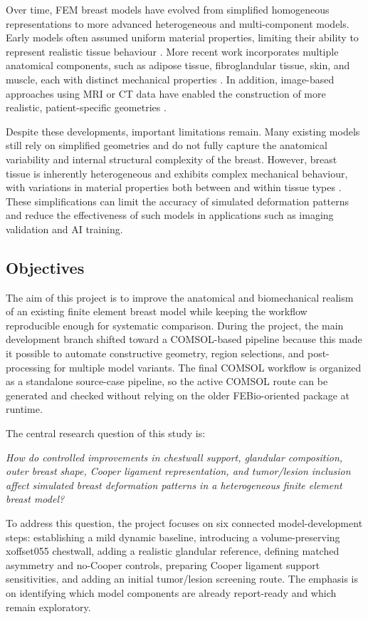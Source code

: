 Over time, FEM breast models have evolved from simplified homogeneous representations to more advanced heterogeneous and multi-component models. Early models often assumed uniform material properties, limiting their ability to represent realistic tissue behaviour \cite{Samani2001}. More recent work incorporates multiple anatomical components, such as adipose tissue, fibroglandular tissue, skin, and muscle, each with distinct mechanical properties \cite{Chen2024, Mazier2024}. In addition, image-based approaches using MRI or CT data have enabled the construction of more realistic, patient-specific geometries \cite{Sturgeon2016}.

Despite these developments, important limitations remain. Many existing models still rely on simplified geometries and do not fully capture the anatomical variability and internal structural complexity of the breast. However, breast tissue is inherently heterogeneous and exhibits complex mechanical behaviour, with variations in material properties both between and within tissue types \cite{Ramiao2016, Goodbrake2022}. These simplifications can limit the accuracy of simulated deformation patterns and reduce the effectiveness of such models in applications such as imaging validation and AI training.

\subsection{Objectives}

The aim of this project is to improve the anatomical and biomechanical realism of an existing finite element breast model while keeping the workflow reproducible enough for systematic comparison. During the project, the main development branch shifted toward a COMSOL-based pipeline because this made it possible to automate constructive geometry, region selections, and post-processing for multiple model variants. The final COMSOL workflow is organized as a standalone source-case pipeline, so the active COMSOL route can be generated and checked without relying on the older FEBio-oriented package at runtime.

The central research question of this study is:

\textit{How do controlled improvements in chestwall support, glandular composition, outer breast shape, Cooper ligament representation, and tumor/lesion inclusion affect simulated breast deformation patterns in a heterogeneous finite element breast model?}

To address this question, the project focuses on six connected model-development steps: establishing a mild dynamic baseline, introducing a volume-preserving xoffset055 chestwall, adding a realistic glandular reference, defining matched asymmetry and no-Cooper controls, preparing Cooper ligament support sensitivities, and adding an initial tumor/lesion screening route. The emphasis is on identifying which model components are already report-ready and which remain exploratory.

